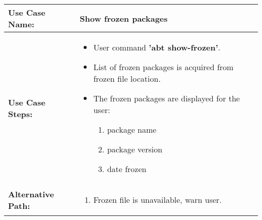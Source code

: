 \medskip

\begin{tabularx}{\linewidth}{|l|X|}
\hline
\textbf{Use Case Name:} & \textbf{Show frozen packages} \\
\hline
\textbf{Use Case Steps:} & 
\begin{minipage}{\linewidth} 
  \vspace{0.05em}
  \begin{itemize}
    \item User command \textbf{'abt show-frozen'}.
    \item List of frozen packages is acquired from frozen file location.
    \item The frozen packages are displayed for the user:
    \begin{enumerate}
      \item package name
      \item package version
      \item date frozen
    \end{enumerate}
  \end{itemize}
  \vspace{0.05em}
\end{minipage}
\\
\hline 
\textbf{Alternative Path:} &
\begin{minipage}{\linewidth}
  \vspace{0.05em} 
  \begin{enumerate}
    \item Frozen file is unavailable, warn user.
  \end{enumerate}
  \vspace{0.05em} 
\end{minipage}
\\
\hline
\end{tabularx}